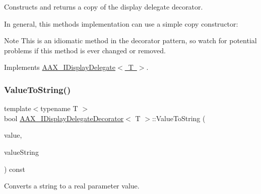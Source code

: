 Constructs and returns a copy of the display delegate decorator. 

In general, this method\textquotesingle{}s implementation can use a simple copy constructor\+:


\begin{DoxyCode}{0}
\DoxyCodeLine{\textcolor{keyword}{}\{}
\DoxyCodeLine{\}}
\end{DoxyCode}


\begin{DoxyNote}{Note}
This is an idiomatic method in the decorator pattern, so watch for potential problems if this method is ever changed or removed. 
\end{DoxyNote}


Implements \mbox{\hyperlink{a01801_a138a82c124ddda8255ce39194dfc1f3f}{A\+A\+X\+\_\+\+I\+Display\+Delegate$<$ T $>$}}.

\mbox{\label{a01805_ada5780cfa332ac7946bf95aa65ae96f5}} 
\subsubsection{\texorpdfstring{ValueToString()}{ValueToString()}\hspace{0.1cm}{\footnotesize\ttfamily [1/2]}}
{\footnotesize\ttfamily template$<$typename T $>$ \\
bool \mbox{\hyperlink{a01805}{A\+A\+X\+\_\+\+I\+Display\+Delegate\+Decorator}}$<$ T $>$\+::Value\+To\+String (\begin{DoxyParamCaption}\item[{T}]{value,  }\item[{\mbox{\hyperlink{a01573}{A\+A\+X\+\_\+\+C\+String}} $\ast$}]{value\+String }\end{DoxyParamCaption}) const\hspace{0.3cm}{\ttfamily [virtual]}}



Converts a string to a real parameter value. 

